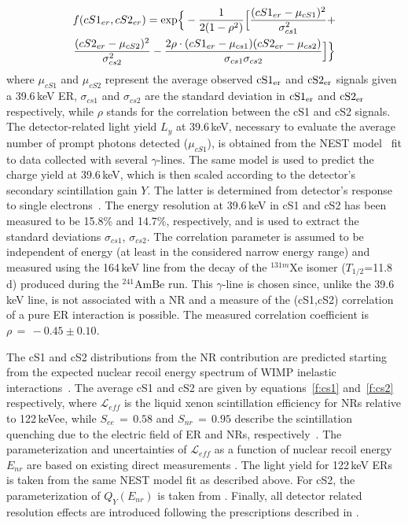 \begin{multline}
	f(cS1_{er},cS2_{er})  = {\rm exp} \Big\{ -\frac{1}{2(1-\rho^2)} \Big[ \frac{(cS1_{er} - \mu_{cS1})^2}{\sigma_{cs1}^2} + \\ 
	 \frac{(cS2_{er} - \mu_{cS2})^2}{\sigma_{cs2}^2} - \frac{2\rho\cdot(cS1_{er} - \mu_{cs1}) (cS2_{er} - \mu_{cs2})} {\sigma_{cs1}\sigma_{cs2}} \Big] \Big\}
\label{f:2dgaus}
\end{multline}
where $\mu_{cS1}$ and $\mu_{cS2}$ 
represent the average observed $\rm{cS1_{er}}$ and $\rm{cS2_{er}}$ signals given a 39.6\,keV ER, $\sigma_{cs1}$ and $\sigma_{cs2}$ are the standard deviation in $\rm{cS1_{er}}$ and $\rm{cS2_{er}}$ respectively,
while $\rho$ stands for the correlation between the cS1 and cS2 signals. The detector-related light yield $L_y$  at 39.6\,keV, necessary to evaluate the average number of prompt photons detected 
($\mu_{cS1}$), is obtained from the NEST model~\cite{NEST,Geant1,Geant2} fit to data collected with several $\gamma$-lines.
The same model is used to predict the charge yield at 39.6\,keV, which is then scaled according to the detector's secondary scintillation gain $Y$. 
 The latter is determined from detector's response to single electrons~\cite{SingleE}.
The energy resolution at 39.6\,keV in cS1 and cS2 has been measured to be 15.8\% and 14.7\%, respectively, and is used to extract the standard 
deviations $\sigma_{cs1}$, $\sigma_{cs2}$.  The correlation parameter is assumed to be independent of energy (at least in the considered narrow energy range) and measured
using the 164\,keV line from the decay of the $^{131m}$Xe isomer ($T_{1/2}$=11.8\,d) produced during the  $^{241}$AmBe run. This $\gamma$-line is chosen since, unlike the 39.6\,keV line,  is not associated with a NR and a measure of the (cS1,cS2) correlation of a pure ER interaction is possible. The measured correlation coefficient is $\rho \, = \, -0.45 \pm 0.10$. 


The cS1 and cS2 distributions from the NR contribution are predicted starting from the expected nuclear recoil energy spectrum
of WIMP inelastic interactions~\cite{Baudis:2013bba}. The average cS1 and cS2 are given by equations~\ref{f:cs1} and~\ref{f:cs2} respectively,
where $\mathcal{L}_{eff}$ is the liquid xenon scintillation efficiency for NRs relative to 122\,keVee, while $S_{ee} \, = \, 0.58$  and $S_{nr} \, = \, 0.95$ describe the scintillation 
quenching due to the electric field of ER and NRs, respectively~\cite{ScintQuenching}. The parameterization and uncertainties of $\mathcal{L}_{eff}$ as a function of nuclear
recoil energy $E_{nr}$ are based on existing direct measurements \cite{run8Result}. The light yield for 122\,keV ERs is taken from the same NEST model fit as described above. For cS2, the parameterization 
of $Q_{Y}(E_{nr})$ is taken from \cite{QY}. Finally, all detector related resolution effects are introduced following the prescriptions described in \cite{Aprile:2012vw}.

